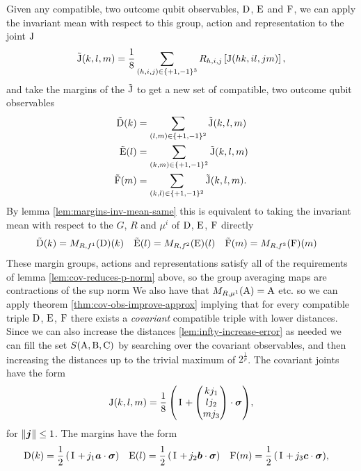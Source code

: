 Given any compatible, two outcome qubit observables, $\operatorname{D}$, $\operatorname{E}$ and $\operatorname{F}$, we can apply the invariant mean with respect to this group, action and representation to the joint $\operatorname{J}$
\begin{equation}
  \tilde{\operatorname{J}}(k,l,m) = \frac{1}{8}\sum_{(h,i,j)\in\{+1,-1\}^3} R_{{h}, {i}, {j}}\left[\operatorname{J}(hk, il, jm) \right],
\end{equation}
and take the margins of the $\tilde{\operatorname{J}}$ to get a new set of compatible, two outcome qubit observables
\begin{align}
  \tilde{\operatorname{D}}(k) &= \sum_{(l,m)\in\{+1,-1\}^2}\tilde{\operatorname{J}}(k,l,m)\\
  \tilde{\operatorname{E}}(l) &= \sum_{(k,m)\in\{+1,-1\}^2}\tilde{\operatorname{J}}(k,l,m)\\
  \tilde{\operatorname{F}}(m) &= \sum_{(k,l)\in\{+1,-1\}^2}\tilde{\operatorname{J}}(k,l,m).
\end{align}
By lemma \ref{lem:margins-inv-mean-same} this is equivalent to taking the invariant mean with respect to the $G$, $R$ and $\mu^i$ of $\operatorname{D}$, $\operatorname{E}$, $\operatorname{F}$ directly
\begin{align}
  \tilde{\operatorname{D}}(k) &= M_{R,f^1}(\operatorname{D})(k) & \tilde{\operatorname{E}}(l) &= M_{R,f^2}(\operatorname{E})(l) & \tilde{\operatorname{F}}(m) &= M_{R,f^3}(\operatorname{F})(m)
\end{align}
These margin groups, actions and representations satisfy all of the requirements of lemma \ref{lem:cov-reduces-p-norm} above, so the group averaging maps are contractions of the sup norm We also have that $M_{R,\mu^1}(\operatorname{A}) = \operatorname{A}$ etc. so we can apply theorem \ref{thm:cov-obs-improve-approx} implying that for every compatible triple $\operatorname{D}$, $\operatorname{E}$, $\operatorname{F}$ there exists a \emph{covariant} compatible triple with lower distances. Since we can also increase the distances \ref{lem:infty-increase-error} as needed we can fill the set $S(\operatorname{A}, \operatorname{B}, \operatorname{C})$ by searching over the covariant observables, and then increasing the distances up to the trivial maximum of $2^{\frac{1}{p}}$.
The covariant joints have the form
\begin{align}
  \opj(k,l,m) = \qbit[][+][\frac{1}{8}]{\begin{pmatrix}k j_1\\ l j_2 \\ m j_3\end{pmatrix}},
\end{align}
for ${\left\lVert{\bm{j}}\right\rVert}\leq 1$. The margins have the form
\begin{align}
  \opd(k) &= \qbit{j_1 \boa} &
                               \ope(l) &= \qbit{j_2 \bob}&
                                                           \opf(m) &= \qbit{j_3 \boc},
\end{align}
